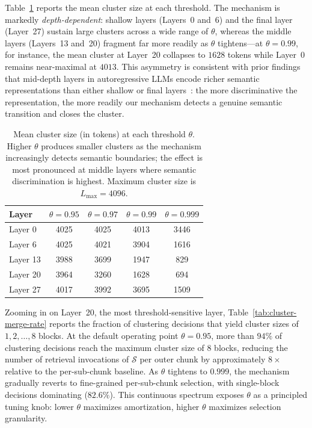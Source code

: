 \documentclass[10pt,conference]{IEEEtran}
\begin{document}
Table~\ref{tab:cluster-sizes} reports the mean cluster size at each
threshold. The mechanism is markedly \textit{depth-dependent}: shallow
layers (Layers~0 and~6) and the final layer (Layer~27) sustain large
clusters across a wide range of $\theta$, whereas the middle layers
(Layers~13 and~20) fragment far more readily as $\theta$ tightens---at
$\theta = 0.99$, for instance, the mean cluster at Layer~20 collapses to
$1628$ tokens while Layer~0 remains near-maximal at $4013$. This
asymmetry is consistent with prior findings that mid-depth layers in
autoregressive LLMs encode richer semantic representations than either
shallow or final layers~\cite{skean2025layerbylayer}: the more
discriminative the representation, the more readily our mechanism
detects a genuine semantic transition and closes the cluster.

\begin{table}[t]
\centering
\caption{Mean cluster size (in tokens) at each threshold $\theta$. 
Higher $\theta$ produces smaller clusters as the mechanism increasingly 
detects semantic boundaries; the effect is most pronounced at middle 
layers where semantic discrimination is highest. Maximum cluster size 
is $L_{\max} = 4096$.}
\label{tab:cluster-sizes}
\small
\begin{tabular}{lcccc}
\toprule
Layer & $\theta = 0.95$ & $\theta = 0.97$ & $\theta = 0.99$ & $\theta = 0.999$ \\
\midrule
Layer 0  & 4025 & 4025 & 4013 & 3446 \\
Layer 6  & 4025 & 4021 & 3904 & 1616 \\
Layer 13 & 3988 & 3699 & 1947 & \phantom{0}829 \\
Layer 20 & 3964 & 3260 & 1628 & \phantom{0}694 \\
Layer 27 & 4017 & 3992 & 3695 & 1509 \\
\bottomrule
\end{tabular}
\end{table}

Zooming in on Layer~20, the most threshold-sensitive layer,
Table~\ref{tab:cluster-merge-rate} reports the fraction of clustering
decisions that yield cluster sizes of $1, 2, \ldots, 8$ blocks. At the
default operating point $\theta = 0.95$, more than
$94\%$ of clustering decisions reach the maximum cluster size of $8$ 
blocks, reducing the number of retrieval invocations of $\mathcal{S}$ 
per outer chunk by approximately $8\times$ relative to the 
per-sub-chunk baseline. As $\theta$ tightens to $0.999$, the mechanism 
gradually reverts to fine-grained per-sub-chunk selection, with 
single-block decisions dominating ($82.6\%$). This continuous spectrum 
exposes $\theta$ as a principled tuning knob: lower $\theta$ maximizes 
amortization, higher $\theta$ maximizes selection granularity.
\end{document}
